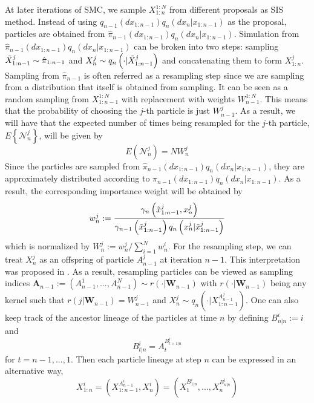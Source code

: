 \documentclass[12pt,a4paper]{article}
\begin{document}
At later iterations of SMC, we sample $X_{1:n}^{1:N}$ from different proposals as SIS method. Instead of using $q_{n-1}(dx_{1:n-1})q_n(dx_n|x_{1:n-1})$ as the proposal, particles are obtained from $\hat{\pi}_{n-1}(dx_{1:n-1})q_{n}(dx_n|x_{1:n-1})$. Simulation from $\hat{\pi}_{n-1}(dx_{1:n-1})q_{n}(dx_n|x_{1:n-1})$ can be broken into two steps: sampling $\Tilde{X}_{1:n-1}^j \sim \hat{\pi}_{1:n-1}$ and $X_n^j \sim q_n\left(\cdot|\Tilde{X}_{1:n-1}^j\right)$ and concatenating them to form $X_{1:n}^j$. Sampling from $\hat{\pi}_{n-1}$ is often referred as a resampling step since we are sampling from a distribution that itself is obtained from sampling. It can be seen as a random sampling from $X_{1:n-1}^{1:N}$ with replacement with weights $W_{n-1}^{1:N}$. This means that the probability of choosing the $j$-th particle is just $W_{n-1}^j$. As a result, we will have that the expected number of times being resampled for the $j$-th particle, $E\left\{\mathcal{N}_n^j\right\}$, will be given by 
$$E \left(\mathcal{N}_n^j\right) = N W_n^j$$
Since the particles are sampled from $\hat{\pi}_{n-1}(dx_{1:n-1})q_{n}(dx_n|x_{1:n-1})$, they are approximately distributed according to $\pi_{n-1}(dx_{1:n-1})q_n(dx_n|x_{1:n-1})$. As a result, the corresponding importance weight will be obtained by 
\begin{equation}
    \label{SIR - Later Importance Weight}
    w_n^j := \frac{\gamma_n\left(\Tilde{x}_{1:n-1}^j,x_n^j\right)}{\gamma_{n-1}\left(\Tilde{x}_{1:n-1}^j\right)q_n\left(x_n^j|\Tilde{x}_{1:n-1}^j\right)}
\end{equation}
which is normalized by $W_n^j := w_n^j / \sum_{i=1}^{N} w_n^i$. For the resampling step, we can treat $X_n^j$ as an offspring of particle $A_{n-1}^j$ at iteration $n-1$. This interpretation was proposed in \cite{andrieu2010particle}. As a result, resampling particles can be viewed as sampling indices $\mathbf{A}_{n-1}:= \left(A_{n-1}^1,...,A_{n-1}^N\right) \sim r\left(\cdot|\mathbf{W}_{n-1}\right)$ with $r\left(\cdot|\mathbf{W}_{n-1}\right)$ being any kernel such that $r\left(j|\mathbf{W}_{n-1}\right) = W_{n-1}^j$ and $X_n^j \sim q_n\left(\cdot|X_{1:n-1}^{A_{n-1}^j}\right)$. One can also keep track of the ancestor lineage of the particles at time $n$ by defining $B_{n|n}^i := i$ and 
$$B_{t|n}^i = A_{t}^{B_{t+1|n}^i}$$
for $t = n-1,...,1$. Then each particle lineage at step $n$ can be expressed in an alternative way,
$$X_{1:n}^i = \left(X_{1:n-1}^{A_{n-1}^i},X_n^i\right)=\left(X_1^{B_{1|n}^i},...,X_n^{B_{n|n}^i}\right)$$
\end{document}
